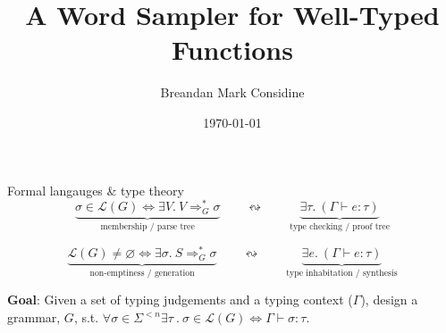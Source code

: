 \documentclass{beamer}
\title{A Word Sampler for Well-Typed Functions}
\author{Breandan Mark Considine}
\date{\today}
\begin{document}
\begin{frame}
  \titlepage
\end{frame}

\begin{frame}{Formal langauges \& type theory}
  \vspace{-0.3cm}
    \[
      \underbrace{\sigma \in \mathcal{L}(G) \Leftrightarrow  \exists V.\ V \Rightarrow_G^{\!*} \sigma}_{\text{membership / parse tree}}
      \qquad\leftrightsquigarrow\qquad
      \underbrace{\exists \tau .\ (\Gamma \vdash e : \tau)}_{\text{type checking / proof tree}}
    \]
\vspace{0.2cm}
    \begin{prooftree}
    \end{prooftree}

    \[
      \underbrace{\mathcal{L}(G) \neq \varnothing \Leftrightarrow \exists \sigma.\ S \Rightarrow_G^{\!*} \sigma}_{\text{non-emptiness / generation}}
      \qquad\leftrightsquigarrow\qquad
      \underbrace{\exists e .\ (\Gamma \vdash e : \tau)}_{\text{type inhabitation / synthesis}}
    \]

  \vspace{0.3cm}
      \textbf{Goal}: Given a set of typing judgements and a typing context ($\Gamma$), design a grammar, $G$, s.t. $\forall \sigma\in\Sigma^{<n} \exists \tau\ .\ \sigma \in \mathcal{L}(G)\Longleftrightarrow\Gamma\vdash\sigma:\tau$.
\end{frame}
\end{document}
